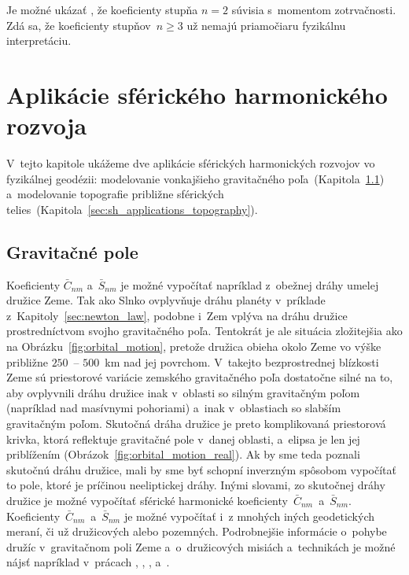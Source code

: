 \documentclass[a4paper, 12pt]{book}
\begin{document}
Je možné ukázať \parencite[napríklad][]{MoritzPhysicalGeodesy}, že koeficienty 
stupňa $n = 2$ súvisia s~momentom zotrvačnosti.  Zdá sa, že koeficienty 
stupňov~$n \geq 3$ už nemajú priamočiaru fyzikálnu interpretáciu.







\section{Aplikácie sférického harmonického rozvoja}
\label{sec:spherical_harmonics_applications}

V~tejto kapitole ukážeme dve aplikácie sférických harmonických rozvojov vo 
fyzikálnej geodézii: modelovanie vonkajšieho gravitačného 
poľa~(Kapitola~\ref{sec:sh_applications_gravity_field})
a~modelovanie topografie približne sférických 
telies~(Kapitola~\ref{sec:sh_applications_topography}).

\subsection{Gravitačné pole}
\label{sec:sh_applications_gravity_field}

Koeficienty $\bar{C}_{nm}$ a~$\bar{S}_{nm}$ je možné vypočítať napríklad 
z~obežnej dráhy umelej družice Zeme.  Tak ako Slnko ovplyvňuje dráhu planéty 
v~príklade z~Kapitoly~\ref{sec:newton_law}, podobne i~Zem vplýva na dráhu 
družice prostredníctvom svojho gravitačného poľa.  Tentokrát je ale situácia 
zložitejšia ako na Obrázku~\ref{fig:orbital_motion}, pretože družica obieha 
okolo Zeme vo výške približne $250$~-- $500$~km nad jej povrchom.  V~takejto 
bezprostrednej blízkosti Zeme sú priestorové variácie zemského gravitačného 
poľa dostatočne silné na to, aby ovplyvnili dráhu družice inak v~oblasti so 
silným gravitačným poľom (napríklad nad masívnymi pohoriami) a~inak 
v~oblastiach so slabším gravitačným poľom.  Skutočná dráha družice je preto 
komplikovaná priestorová krivka, ktorá reflektuje gravitačné pole v~danej 
oblasti, a~elipsa je len jej priblížením 
(Obrázok~\ref{fig:orbital_motion_real}).  Ak by sme teda poznali skutočnú dráhu 
družice, mali by sme byť schopní inverzným spôsobom vypočítať to pole, ktoré je 
príčinou neeliptickej dráhy.  Inými slovami, zo skutočnej dráhy družice je 
možné vypočítať sférické harmonické 
koeficienty~$\bar{C}_{nm}$~a~$\bar{S}_{nm}$.  
Koeficienty~$\bar{C}_{nm}$~a~$\bar{S}_{nm}$ je možné vypočítať i~z mnohých 
iných geodetických meraní, či už družicových alebo pozemných.  Podrobnejšie 
informácie o~pohybe družíc v~gravitačnom poli Zeme a~o~družicových misiách 
a~technikách je možné nájsť napríklad v~prácach 
\textcite{SeeberSatelliteGeodesy}, \textcite{MoritzPhysicalGeodesy}, 
\textcite{Kostelecky2008}, \textcite{Melicher2009} a~\textcite{Husar2017}.
\end{document}
